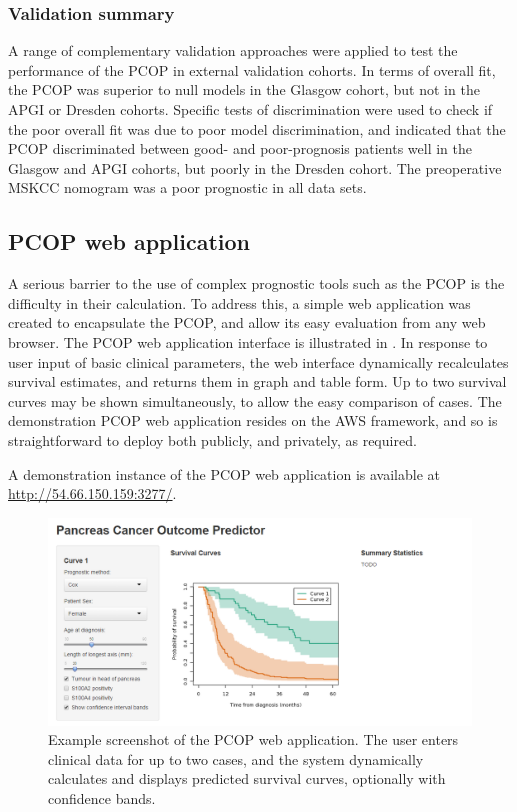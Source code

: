 \documentclass[dissertation.tex]{subfiles}
\begin{document}
\subsubsection{Validation summary}
A range of complementary validation approaches were applied to test the performance of the \gls{PCOP} in external validation cohorts.  In terms of overall fit, the \gls{PCOP} was superior to null models in the Glasgow cohort, but not in the \gls{APGI} or Dresden cohorts.  Specific tests of discrimination were used to check if the poor overall fit was due to poor model discrimination, and indicated that the \gls{PCOP} discriminated between good- and poor-prognosis patients well in the Glasgow and \gls{APGI} cohorts, but poorly in the Dresden cohort.  The preoperative \gls{MSKCC} nomogram was a poor prognostic in all data sets.

\subsection{PCOP web application}
A serious barrier to the use of complex prognostic tools such as the \gls{PCOP} is the difficulty in their calculation.  To address this, a simple web application was created to encapsulate the \gls{PCOP}, and allow its easy evaluation from any web browser.  The \gls{PCOP} web application interface is illustrated in .  In response to user input of basic clinical parameters, the web interface dynamically recalculates survival estimates, and returns them in graph and table form.  Up to two survival curves may be shown simultaneously, to allow the easy comparison of cases.  The demonstration \gls{PCOP} web application resides on the \gls{AWS} framework, and so is straightforward to deploy both publicly, and privately, as required.

A demonstration instance of the \gls{PCOP} web application is available at \url{http://54.66.150.159:3277/}.

\begin{figure}
\centering
  \includegraphics[width=1\linewidth]{analysis/nomogram/webapp/PCOP.png}
\caption[Example screenshot of the \acrshort{PCOP} web application]{Example screenshot of the \gls{PCOP} web application.  The user enters clinical data for up to two cases, and the system dynamically calculates and displays predicted survival curves, optionally with confidence bands.}
\label{fig:nomo-web-example}
\end{figure}
\end{document}
